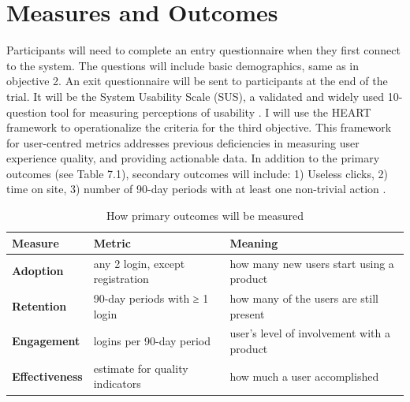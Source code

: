 \section{Measures and Outcomes}
Participants will need to complete an entry questionnaire when they first connect to the system. The questions will include basic demographics, same as in objective 2. An exit questionnaire will be sent to participants at the end of the trial. It will be the System Usability Scale (\gls{SUS}), a validated and widely used 10-question tool for measuring perceptions of usability \cite{united2006research}.
I will use the HEART framework to operationalize the criteria for the third objective. This framework for user-centred metrics addresses previous deficiencies in measuring user experience quality, and providing actionable data. In addition to the primary outcomes (see Table 7.1), secondary outcomes will include: 1) Useless clicks, 2) time on site, 3) number of 90-day periods with at least one non-trivial action \cite{rodden2010measuring}.

\begingroup
\setlength{\tabcolsep}{8pt} %
\renewcommand{\arraystretch}{1.5} %
\small
\begin{table}[h!]
\vspace{-2mm}
\begin{tabular}{l|l|l}
\textbf{Measure}       & \textbf{Metric}                  & \textbf{Meaning}                           \\
\hline                                                                                                    
\textbf{Adoption}      & any 2 login, except registration & how many new users start using a product   \\
\textbf{Retention}     & 90-day periods with ≥ 1 login    & how many of the users are still present    \\
\textbf{Engagement}    & logins per 90-day period         & user’s level of involvement with a product \\
\textbf{Effectiveness} & estimate for quality indicators  & how much a user accomplished
\end{tabular}
\caption{How primary outcomes will be measured}
\vspace{-5mm}
\end{table}
\endgroup

